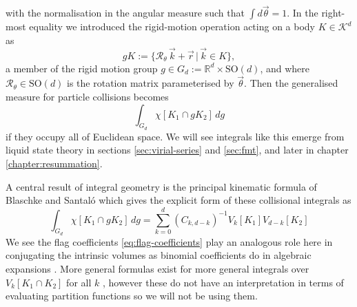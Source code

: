 with the normalisation in the angular measure such that $\int d\vec{\theta} = 1$.
In the right-most equality we introduced the rigid-motion operation acting on a body $K \in \mathcal{K}^d$ as
\begin{equation*}
  g K := \{\mathcal{R}_\theta \, \vec{k} + \vec{r} \, | \, \vec{k} \in K\},
\end{equation*}
a member of the rigid motion group $g \in G_d := \mathbb{R}^d \times \mathrm{SO}(d)$, and where $\mathcal{R}_\theta \in \mathrm{SO}(d)$%
is the rotation matrix parameterised by $\vec{\theta}$.
Then the generalised measure for particle collisions becomes
\begin{equation*}
  \int_{G_d} \chi[K_1 \cap g K_2] \, dg
\end{equation*}
if they occupy all of Euclidean space.
We will see integrals like this emerge from liquid state theory in sections \ref{sec:virial-series} and \ref{sec:fmt}, and later in chapter \ref{chapter:resummation}.

\vspace{0.5em}

\begin{tcolorbox}[title=Principal kinematic formula]
  A central result of integral geometry is the principal kinematic formula of Blaschke and Santal\'o \cite{BlaschkeMZ1936,Blaschke1937,SantaloASI1936} which gives the explicit form of these collisional integrals as \cite{Santalo2004,Klain1997}
  \begin{equation}\label{eq:binomial-kinematic-formula}
    \int_{G_d} \chi[K_1 \cap g K_2] \, dg
    =
    \sum_{k=0}^d (C_{k,d-k})^{-1} V_k[K_1] V_{d-k}[K_2]
  \end{equation}
  We see the flag coefficients \eqref{eq:flag-coefficients} play an analogous role here in conjugating the intrinsic volumes as binomial coefficients do in algebraic expansions%
  .
  More general formulas exist for more general integrals over $V_k[K_1 \cap K_2]$ for all $k$ \cite{Klain1997}, however these do not have an interpretation in terms of evaluating partition functions so we will not be using them.
\end{tcolorbox}

